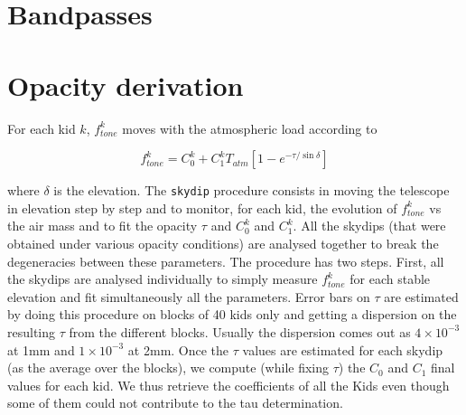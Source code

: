 \documentclass[a4paper, 11pt]{article} %
\begin{document}
\section{Bandpasses}



\section{Opacity derivation}
\label{se:opacities}

For each kid $k$, $f_{tone}^k$ moves with the atmospheric load according to

\begin{equation}
f_{tone}^k = C_0^k + C_1^k T_{atm}[1-e^{-\tau/\sin\delta}]
\end{equation}

where $\delta$ is the elevation. The {\tt skydip} procedure consists in moving
the telescope in elevation step by step and to monitor, for each kid, the
evolution of $f_{tone}^k$ vs the air mass and to fit the opacity $\tau$ and
$C_0^k$ and $C_1^k$. All the skydips (that were obtained under various opacity
conditions) are analysed together to break the degeneracies between these
parameters. The procedure has two steps. First, all the skydips are analysed
individually to simply measure $f_{tone}^k$ for each stable elevation and fit
simultaneously all the parameters. Error bars on $\tau$ are estimated by doing
this procedure on blocks of 40 kids only and getting a dispersion on the
resulting $\tau$ from the different blocks. Usually the dispersion comes out as
$4\times 10^{-3}$ at 1mm and $1\times 10^{-3}$ at 2mm. Once the $\tau$ values
are estimated for each skydip (as the average over the blocks), we compute
(while fixing $\tau$) the $C_0$ and $C_1$ final values for each kid. We thus
retrieve the coefficients of all the Kids even though some of them could not
contribute to the tau determination.

\end{document}
